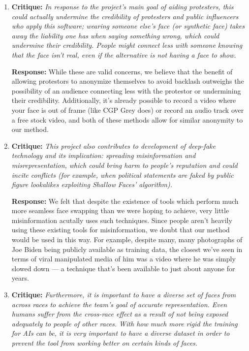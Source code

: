 \begin{enumerate}
    \item \textbf{Critique:} \textit{In response to the project’s main goal of aiding protesters, this could actually
    undermine the credibility of protesters and public influencers who apply this
    software; wearing someone else’s face (or synthetic face) takes away the liability
    one has when saying something wrong, which could undermine their credibility.
    People might connect less with someone knowing that the face isn’t real, even if
    the alternative is not having a face to show.}

    \textbf{Response:} While these are valid concerns, we believe that the benefit of allowing protestors to anonymize themselves
    to avoid backlash outweighs the possibility of an audience connecting less with the protestor or undermining their credibility. Additionally, it's already possible to record a video where your face is out of frame (like CGP Grey does) or record an audio track over a free stock video, and both of these methods allow for similar anonymity to our method.

    \item \textbf{Critique:} \textit{This project also contributes to development of deep-fake technology and its implication: spreading misinformation
    and misrepresentation, which could bring harm to people’s reputation and could incite conflicts (for example, when political statements are faked by public figure lookalikes exploiting Shallow Faces’ algorithm).}

    \textbf{Response:} We felt that despite the existence of tools which perform much more seamless face swapping than we were hoping to achieve, very little misinformation acutally uses such techniques. Since people aren't heavily using these existing tools for misinformation, we doubt that our method would be used in this way.
    For example, despite many, many photographs of Joe Biden being publicly available as training data, the closest we've seen in terms of viral manipulated media of him was a video where he was simply slowed down — a technique that's been available to just about anyone for years.

    \item \textbf{Critique:} \textit{Furthermore, it is important to have a diverse set of faces from across races to
    achieve the team’s goal of accurate representation. Even humans suffer from the cross-race effect as a result of not being exposed adequately to people of other
    races. With how much more rigid the training for AIs can be, it is very important
    to have a diverse dataset in order to prevent the tool from working better on certain
    kinds of faces.}


\end{enumerate}
